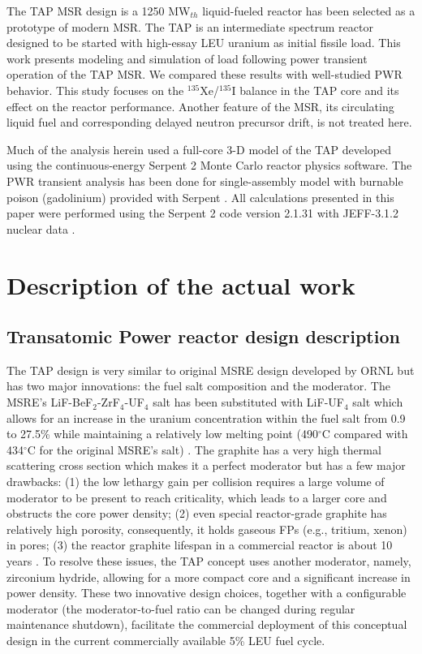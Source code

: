 \documentclass{anstrans}
\begin{document}
The \gls{TAP} \gls{MSR} design is a 1250 MW$_{th}$ liquid-fueled reactor has 
been selected as a prototype of modern \gls{MSR}. The \gls{TAP} is an 
intermediate spectrum reactor designed to be started with high-essay \gls{LEU} 
uranium as initial fissile load. This work presents modeling and simulation of 
load following power transient operation of the \gls{TAP} \gls{MSR}. We 
compared these results with well-studied \gls{PWR} behavior. This study 
focuses on the $^{135}$Xe/$^{135}$I balance in the \gls{TAP} core and its 
effect on the reactor performance. Another feature of the \gls{MSR}, its 
circulating liquid fuel and
corresponding delayed neutron precursor drift, is 
not treated
here.

Much of the analysis herein used a full-core 3-D model of the \gls{TAP}  
developed using the continuous-energy Serpent 2 Monte Carlo reactor physics 
software. The \gls{PWR} transient analysis has been done for single-assembly 
model with burnable poison (gadolinium) provided with Serpent 
\cite{leppanen_serpent_2015}. All calculations presented in this paper were 
performed using the Serpent 2 code version 2.1.31 with JEFF-3.1.2 nuclear data 
\cite{oecd/nea_jeff-3.1.2_2014}.
\section{Description of the actual work}
\subsection{Transatomic Power reactor design description}
The \gls{TAP} design is very similar to original \gls{MSRE} design developed 
by \gls{ORNL} \cite{haubenreich_experience_1970} but has two major  
innovations: 
the fuel salt composition and the moderator. The \gls{MSRE}'s 
LiF-BeF$_2$-ZrF$_4$-UF$_4$ salt has been substituted with LiF-UF$_4$ salt 
which 
allows for an increase in the uranium concentration within the fuel salt from 
0.9 to 
27.5\% while maintaining a relatively low melting point (490$^{\circ}$C 
compared 
with 434$^{\circ}$C for the original \gls{MSRE}'s salt) 
\cite{betzler_assessment_2017}. The graphite has a very high 
thermal scattering cross section which makes it a perfect moderator but has 
a few major drawbacks: 
(1) the low lethargy gain per collision requires a large volume of moderator 
to be present to reach criticality, which leads to a larger core and obstructs 
the core power density; (2) even special 
reactor-grade graphite has relatively high porosity, consequently, it holds
gaseous \glspl{FP} 
(e.g., tritium, xenon) in pores; (3) the reactor graphite lifespan in a 
commercial 
reactor is about 10 years \cite{robertson_conceptual_1971}. To resolve these 
issues, the \gls{TAP} concept uses another 
moderator, namely, zirconium hydride, allowing for a more compact core and a 
significant increase in power density. These two innovative design choices,  
together with a configurable moderator 
(the moderator-to-fuel ratio can be changed during regular maintenance 
shutdown), 
facilitate the commercial deployment of this conceptual design in the current 
commercially available 5\% \gls{LEU} fuel cycle. 
\end{document}
